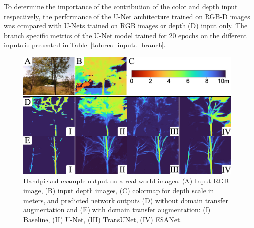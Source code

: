 To determine the importance of the contribution of the color and depth input respectively, the performance of the U-Net architecture trained on RGB-D images was compared with U-Nets trained on RGB images or depth (D) input only. The branch specific metrics of the U-Net model trained for 20 epochs on the different inputs is presented in Table~\ref{tab:res_inputs_branch}. 


\begin{figure}[!hpt]
    \centering
    \includegraphics[width=\linewidth]{chapters/papers/OBR/figures/fig-6-qualtiative-real-comparison/fig-6-qualitative-real-comparison-half-v02.pdf}
    \caption{Handpicked example output on a real-world images. (A) Input RGB image, (B) input depth images, (C) colormap for depth scale in meters, and predicted network outputs (D) without domain transfer augmentation and (E) with domain transfer augmentation: (I) Baseline, (II) U-Net, (III) TransUNet, (IV) ESANet.}
    \label{fig:real_world_data}
    \vspace{-0.2cm}
\end{figure}

